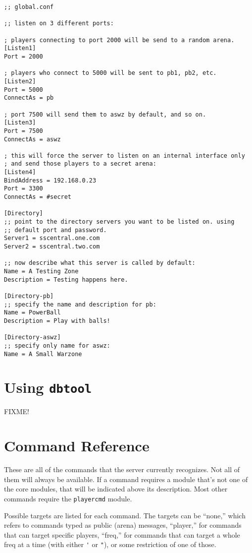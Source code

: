 \documentclass{article}
\begin{document}
\begin{verbatim}
;; global.conf

;; listen on 3 different ports:

; players connecting to port 2000 will be send to a random arena.
[Listen1]
Port = 2000

; players who connect to 5000 will be sent to pb1, pb2, etc.
[Listen2]
Port = 5000
ConnectAs = pb

; port 7500 will send them to aswz by default, and so on.
[Listen3]
Port = 7500
ConnectAs = aswz

; this will force the server to listen on an internal interface only
; and send those players to a secret arena:
[Listen4]
BindAddress = 192.168.0.23
Port = 3300
ConnectAs = #secret

[Directory]
;; point to the directory servers you want to be listed on. using
;; default port and password.
Server1 = sscentral.one.com
Server2 = sscentral.two.com

;; now describe what this server is called by default:
Name = A Testing Zone
Description = Testing happens here.

[Directory-pb]
;; specify the name and description for pb:
Name = PowerBall
Description = Play with balls!

[Directory-aswz]
;; specify only name for aswz:
Name = A Small Warzone
\end{verbatim}


\section{Using \texttt{dbtool}}

FIXME!


\section{Command Reference}

These are all of the commands that the server currently recognizes. Not
all of them will always be available. If a command requires a module
that's not one of the core modules, that will be indicated above its
description. Most other commands require the \texttt{playercmd} module.

Possible targets are listed for each command. The targets can be
``none,'' which refers to commands typed as public (arena) messages,
``player,'' for commands that can target specific players, ``freq,'' for
commands that can target a whole freq at a time (with either \verb/'/ or
\verb/"/), or some restriction of one of those.
\end{document}
